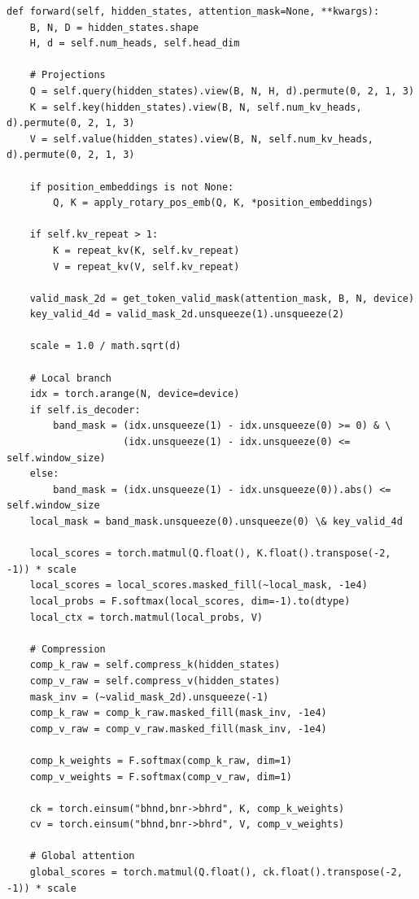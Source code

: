 \begin{lstlisting}
def forward(self, hidden_states, attention_mask=None, **kwargs):
    B, N, D = hidden_states.shape
    H, d = self.num_heads, self.head_dim
    
    # Projections
    Q = self.query(hidden_states).view(B, N, H, d).permute(0, 2, 1, 3)
    K = self.key(hidden_states).view(B, N, self.num_kv_heads, d).permute(0, 2, 1, 3)
    V = self.value(hidden_states).view(B, N, self.num_kv_heads, d).permute(0, 2, 1, 3)
    
    if position_embeddings is not None:
        Q, K = apply_rotary_pos_emb(Q, K, *position_embeddings)
    
    if self.kv_repeat > 1:
        K = repeat_kv(K, self.kv_repeat)
        V = repeat_kv(V, self.kv_repeat)
    
    valid_mask_2d = get_token_valid_mask(attention_mask, B, N, device)
    key_valid_4d = valid_mask_2d.unsqueeze(1).unsqueeze(2)
    
    scale = 1.0 / math.sqrt(d)
    
    # Local branch
    idx = torch.arange(N, device=device)
    if self.is_decoder:
        band_mask = (idx.unsqueeze(1) - idx.unsqueeze(0) >= 0) & \
                    (idx.unsqueeze(1) - idx.unsqueeze(0) <= self.window_size)
    else:
        band_mask = (idx.unsqueeze(1) - idx.unsqueeze(0)).abs() <= self.window_size
    local_mask = band_mask.unsqueeze(0).unsqueeze(0) \& key_valid_4d
    
    local_scores = torch.matmul(Q.float(), K.float().transpose(-2, -1)) * scale
    local_scores = local_scores.masked_fill(~local_mask, -1e4)
    local_probs = F.softmax(local_scores, dim=-1).to(dtype)
    local_ctx = torch.matmul(local_probs, V)
    
    # Compression
    comp_k_raw = self.compress_k(hidden_states)
    comp_v_raw = self.compress_v(hidden_states)
    mask_inv = (~valid_mask_2d).unsqueeze(-1)
    comp_k_raw = comp_k_raw.masked_fill(mask_inv, -1e4)
    comp_v_raw = comp_v_raw.masked_fill(mask_inv, -1e4)
    
    comp_k_weights = F.softmax(comp_k_raw, dim=1)
    comp_v_weights = F.softmax(comp_v_raw, dim=1)
    
    ck = torch.einsum("bhnd,bnr->bhrd", K, comp_k_weights)
    cv = torch.einsum("bhnd,bnr->bhrd", V, comp_v_weights)
    
    # Global attention
    global_scores = torch.matmul(Q.float(), ck.float().transpose(-2, -1)) * scale
    

\end{lstlisting}
